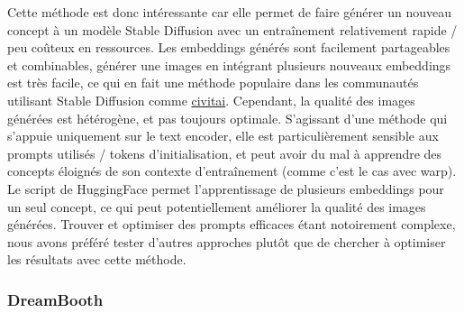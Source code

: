 \documentclass{article}
\begin{document}
\vspace{-0.5cm}
Cette méthode est donc intéressante car elle permet de faire générer un nouveau concept à un modèle Stable Diffusion avec un entraînement relativement rapide / peu coûteux en ressources. Les embeddings générés sont facilement partageables et combinables, générer une images en intégrant plusieurs nouveaux embeddings est très facile, ce qui en fait une méthode populaire dans les communautés utilisant Stable Diffusion comme \href{https://civitai.com/}{civitai}. Cependant, la qualité des images générées est hétérogène, et pas toujours optimale. S'agissant d'une méthode qui s'appuie uniquement sur le text encoder, elle est particulièrement sensible aux prompts utilisés / tokens d'initialisation, et peut avoir du mal à apprendre des concepts éloignés de son contexte d'entraînement (comme c'est le cas avec warp). Le script de HuggingFace permet l'apprentissage de plusieurs embeddings pour un seul concept, ce qui peut potentiellement améliorer la qualité des images générées. Trouver et optimiser des prompts efficaces étant notoirement complexe, nous avons préféré tester d'autres approches plutôt que de chercher à optimiser les résultats avec cette méthode.

\subsubsection{DreamBooth}
\end{document}
